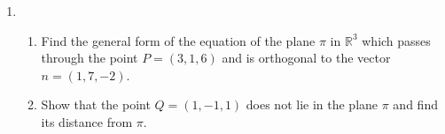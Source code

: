 \documentclass[12pt, a4paper]{report}
\theoremstyle{plain}
\theoremstyle{definition}
\theoremstyle{remark}
\begin{document}
\begin{enumerate}
\item \begin{enumerate}
\item Find the general form of the equation of the plane $\pi$ in $\mathbb{R}^3$ which passes through the point 
$P=(3,1,6)$ and is orthogonal to the vector $n=(1,7,-2)$. %

\item Show that the point $Q=(1,-1,1)$ does not lie in the plane $\pi$ and find its distance from $\pi$. 
\end{enumerate}
\end{enumerate}
\end{document}
